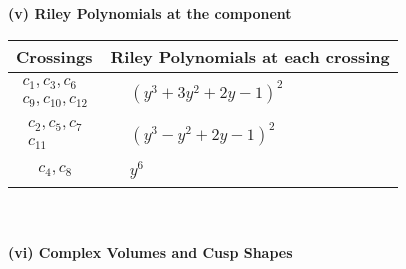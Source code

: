 \documentclass[1p]{elsarticle_modified}
\theoremstyle{definition}
\begin{document}
\newpage\renewcommand{\arraystretch}{1}
\flushleft \textbf{(v) Riley Polynomials at the component}\newline \\
\begin{tabular}{m{50pt}|m{274pt}}
Crossings & \hspace{64pt}Riley Polynomials at each crossing \\
\hline $$\begin{aligned}c_{1},c_{3},c_{6}\\c_{9},c_{10},c_{12}\end{aligned}$$&$\begin{aligned}
&(y^3+3 y^2+2 y-1)^2
\end{aligned}$\\
\hline $$\begin{aligned}c_{2},c_{5},c_{7}\\c_{11}\end{aligned}$$&$\begin{aligned}
&(y^3- y^2+2 y-1)^2
\end{aligned}$\\
\hline $$\begin{aligned}c_{4},c_{8}\end{aligned}$$&$\begin{aligned}
&y^6
\end{aligned}$\\
\hline
\end{tabular}\\~\\
\newpage\flushleft \textbf{(vi) Complex Volumes and Cusp Shapes}
\end{document}
